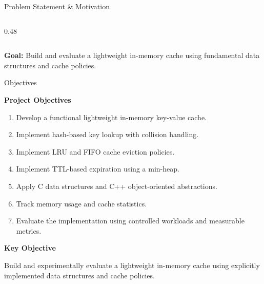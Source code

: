 \documentclass[aspectratio=169,10pt]{beamer}
\begin{document}
\begin{frame}{Problem Statement \& Motivation}
\begin{columns}[T]
\begin{column}{0.48\textwidth}
\end{column}

\end{columns}

\vspace{1mm}

\begin{center}

\colorbox{GEULightBlue}{
\parbox{0.78\textwidth}{
\centering
\textbf{\color{GEUBlue}Goal:}
Build and evaluate a lightweight in-memory cache using
fundamental data structures and cache policies.
}}

\end{center}

\end{frame}



\begin{frame}{Objectives}

\textbf{\color{GEUBlue}Project Objectives}

\vspace{2mm}

\begin{enumerate}

\item Develop a functional lightweight in-memory key-value cache.

\item Implement hash-based key lookup with collision handling.

\item Implement LRU and FIFO cache eviction policies.

\item Implement TTL-based expiration using a min-heap.

\item Apply C data structures and C++ object-oriented abstractions.

\item Track memory usage and cache statistics.

\item Evaluate the implementation using controlled workloads
and measurable metrics.

\end{enumerate}

\vfill

\begin{center}

\colorbox{GEULightBlue}{
\parbox{0.82\textwidth}{
\centering

\textbf{\color{GEUBlue}Key Objective}

\vspace{1mm}

Build and experimentally evaluate a lightweight in-memory cache
using explicitly implemented data structures and cache policies.

}}

\end{center}

\end{frame}
\end{document}
